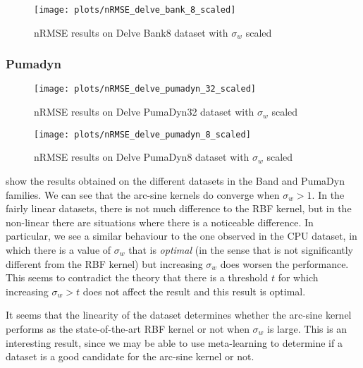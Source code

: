 \begin{figure}[H]
    \texttt{[image: plots/nRMSE\_delve\_bank\_8\_scaled]}
    \caption{nRMSE results on Delve Bank8 dataset with $\sigma_w$ scaled}
    \label{fig:nrmse-delve-bank-8-scaled}
\end{figure}

\subsubsection{Pumadyn}

\begin{figure}[H]
    \texttt{[image: plots/nRMSE\_delve\_pumadyn\_32\_scaled]}
    \caption{nRMSE results on Delve PumaDyn32 dataset with $\sigma_w$ scaled}
    \label{fig:nrmse-delve-pumadyn-32-scaled}
\end{figure}

\begin{figure}[H]
    \texttt{[image: plots/nRMSE\_delve\_pumadyn\_8\_scaled]}
    \caption{nRMSE results on Delve PumaDyn8 dataset with $\sigma_w$ scaled}
    \label{fig:nrmse-delve-pumadyn-8-scaled}
\end{figure}

show the results obtained on the different datasets in the Band and PumaDyn
families. We can see that the arc-sine kernels do converge when $\sigma_w > 1$.
In the fairly linear datasets, there is not much difference to the RBF kernel,
but in the non-linear there are situations where there is a noticeable
difference. In particular, we see a similar behaviour to the one observed in the
CPU dataset, in which there is a value of $\sigma_w$ that is \emph{optimal} (in
the sense that is not significantly different from the RBF kernel) but
increasing $\sigma_w$ does worsen the performance. This seems to contradict the
theory that there is a threshold $t$ for which increasing $\sigma_w > t$ does
not affect the result and this result is optimal.

It seems that the linearity of the dataset determines whether the arc-sine
kernel performs as the state-of-the-art RBF kernel or not when $\sigma_w$ is
large. This is an interesting result, since we may be able to use meta-learning
to determine if a dataset is a good candidate for the arc-sine kernel or not.


